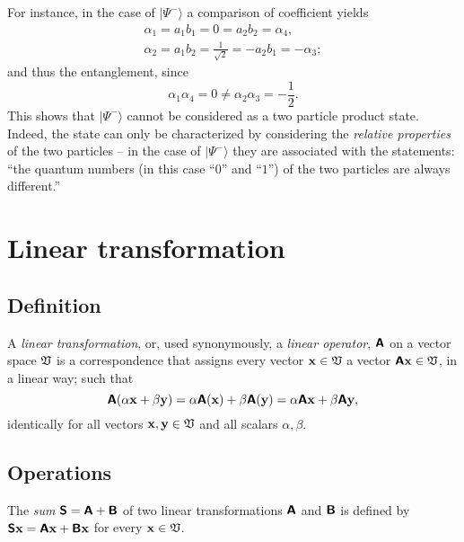 {For instance, in the case of $\vert \Psi^- \rangle$ a comparison of coefficient yields
\begin{equation}
\begin{split}
\alpha_1=a_1b_1=0=a_2b_2=\alpha_4,      \\
\alpha_2=a_1b_2=\frac{1}{\sqrt{2}}=-a_2b_1=-\alpha_3;
\end{split}
\label{2012-m-ch-fdvs-BellSCC}
\end{equation}
and thus
the entanglement, since
\begin{equation}
{\alpha_1}{\alpha_4}=0 \neq {\alpha_2}{\alpha_3}=-\frac{1}{2}.
\end{equation}
This shows that  $\vert \Psi^- \rangle$ cannot be considered as a two particle product state.
Indeed, the state can only be characterized by considering the {\em relative properties}
of the two particles --
in the case of  $\vert \Psi^- \rangle$ they are associated with the statements:\cite{zeil-99}
``the quantum numbers (in this case ``$0$'' and ``$1$'') of the two particles are always different.''

\eexample
}



\section{Linear transformation}
\label{2019-mm-ch-fdvs-lt}

\subsection{Definition}
A {\em linear transformation}, or, used synonymously, a {\em linear operator},
$\textsf{\textbf{A}} $ on a vector space ${\frak V}$ is a correspondence that assigns every vector
${\bf x}\in {\frak V}$ a vector $\textsf{\textbf{A}} {\bf x}\in {\frak V}$,
in a linear way; such  that
\begin{equation}
\textsf{\textbf{A}}  (\alpha {\bf x}+ \beta {\bf y}) = \alpha \textsf{\textbf{A}}({\bf x})
+  \beta \textsf{\textbf{A}} ({\bf y}) = \alpha \textsf{\textbf{A}}{\bf x}
+  \beta \textsf{\textbf{A}} {\bf y},
\end{equation}
identically for all vectors ${\bf x},{\bf y}\in {\frak V}$ and all scalars $\alpha , \beta$.


\subsection{Operations}
The {\em sum}
$\textsf{\textbf{S}} =\textsf{\textbf{A}} +\textsf{\textbf{B}} $
of two linear transformations $\textsf{\textbf{A}}$ and $\textsf{\textbf{B}} $
is defined by
$\textsf{\textbf{S}} {\bf x}=\textsf{\textbf{A}}{\bf x} +\textsf{\textbf{B}} {\bf x}$
for every ${\bf x}\in {\frak V}$.


